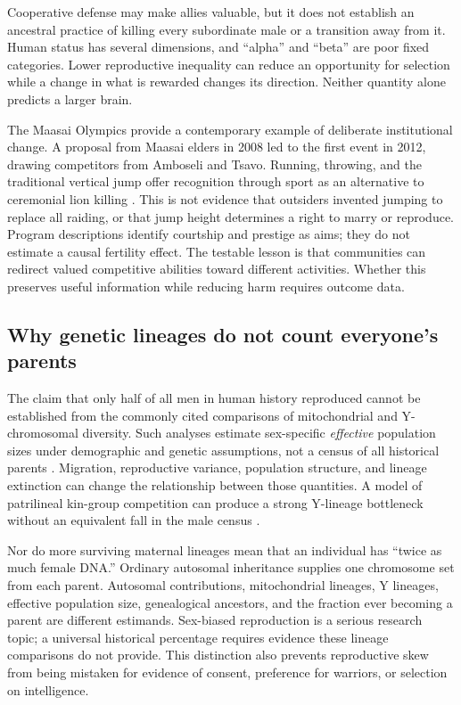 \documentclass[10pt,twocolumn,letterpaper]{article}
\begin{document}
Cooperative defense may make allies valuable, but it does not establish an ancestral practice of killing every subordinate male or a transition away from it. Human status has several dimensions, and ``alpha'' and ``beta'' are poor fixed categories. Lower reproductive inequality can reduce an opportunity for selection while a change in what is rewarded changes its direction. Neither quantity alone predicts a larger brain.

The Maasai Olympics provide a contemporary example of deliberate institutional change. A proposal from Maasai elders in 2008 led to the first event in 2012, drawing competitors from Amboseli and Tsavo. Running, throwing, and the traditional vertical jump offer recognition through sport as an alternative to ceremonial lion killing \citep{chester2026,biglife2026}. This is not evidence that outsiders invented jumping to replace all raiding, or that jump height determines a right to marry or reproduce. Program descriptions identify courtship and prestige as aims; they do not estimate a causal fertility effect. The testable lesson is that communities can redirect valued competitive abilities toward different activities. Whether this preserves useful information while reducing harm requires outcome data.

\subsection{Why genetic lineages do not count everyone's parents}
The claim that only half of all men in human history reproduced cannot be established from the commonly cited comparisons of mitochondrial and Y-chromosomal diversity. Such analyses estimate sex-specific \emph{effective} population sizes under demographic and genetic assumptions, not a census of all historical parents \citep{lippold2014,karmin2015}. Migration, reproductive variance, population structure, and lineage extinction can change the relationship between those quantities. A model of patrilineal kin-group competition can produce a strong Y-lineage bottleneck without an equivalent fall in the male census \citep{zeng2018}.

Nor do more surviving maternal lineages mean that an individual has ``twice as much female DNA.'' Ordinary autosomal inheritance supplies one chromosome set from each parent. Autosomal contributions, mitochondrial lineages, Y lineages, effective population size, genealogical ancestors, and the fraction ever becoming a parent are different estimands. Sex-biased reproduction is a serious research topic; a universal historical percentage requires evidence these lineage comparisons do not provide. This distinction also prevents reproductive skew from being mistaken for evidence of consent, preference for warriors, or selection on intelligence.
\end{document}
